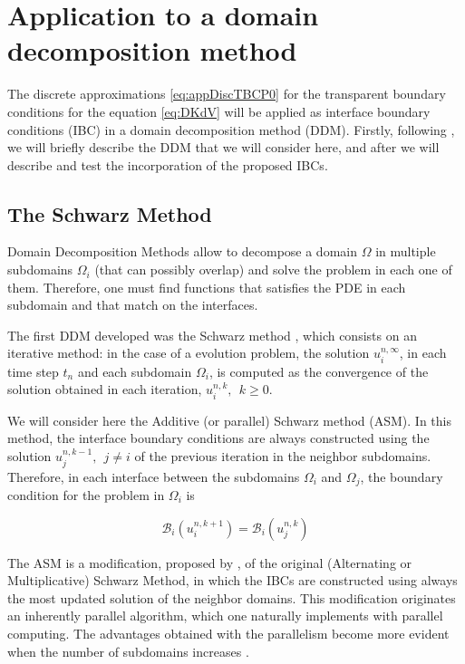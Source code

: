 \section{Application to a domain decomposition method}
\label{sec:DDM}

\indent The discrete approximations \eqref{eq:appDiscTBCP0} for the transparent boundary conditions for the equation \eqref{eq:DKdV} will be applied as interface boundary conditions (IBC) in a domain decomposition method (DDM). Firstly, following \cite{Japhet2003}, we will briefly describe the DDM that we will consider here, and after we will describe and test the incorporation of the proposed IBCs.

\subsection{The Schwarz Method}

\indent Domain Decomposition Methods allow to decompose a domain $\Omega$ in multiple subdomains $\Omega_i$ (that can possibly overlap) and solve the problem in each one of them. Therefore, one must find functions that satisfies the PDE in each subdomain and that match on the interfaces. 

\indent The first DDM developed was the Schwarz method \cite{Japhet2003,Gander2008}, which consists on an iterative method: in the case of a evolution problem, the solution  $u_i^{n,\infty}$, in each time step $t_n$ and each subdomain $\Omega_i$, is computed as the convergence of the solution obtained in each iteration, $u_i^{n,k}, \ \ k\geq 0$.

\indent We will consider here the Additive (or parallel) Schwarz method (ASM). In this method, the interface boundary conditions are always constructed using the solution $u_j^{n,k-1}, \ \ j \neq i$ of the previous iteration in the neighbor subdomains. Therefore, in each interface between the subdomains $\Omega_i$ and $\Omega_j$, the boundary condition for the problem in $\Omega_i$ is

\begin{equation}
	\label{eq:genericIBC}
\mathcal{B}_i(u_i^{n,k+1}) = \mathcal{B}_i(u_j^{n,k})
\end{equation}

\indent The ASM is a modification, proposed by \cite{Lions1988}, of the original (Alternating or Multiplicative) Schwarz Method, in which the IBCs are constructed using always the most updated solution of the neighbor domains. This modification originates an inherently parallel algorithm, which one naturally implements with parallel computing. The advantages obtained with the parallelism become more evident when the number of subdomains increases \cite{Lions1988}.

